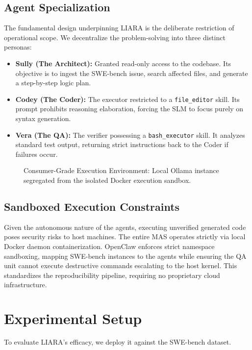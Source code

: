 \documentclass[10pt,journal,compsoc]{IEEEtran}
\begin{document}
\subsection{Agent Specialization}
The fundamental design underpinning LIARA is the deliberate restriction of operational scope. We decentralize the problem-solving into three distinct personas:
\begin{itemize}
    \item \textbf{Sully (The Architect):} Granted read-only access to the codebase. Its objective is to ingest the SWE-bench issue, search affected files, and generate a step-by-step logic plan.
    \item \textbf{Codey (The Coder):} The executor restricted to a \texttt{file\_editor} skill. Its prompt prohibits reasoning elaboration, forcing the SLM to focus purely on syntax generation.
    \item \textbf{Vera (The QA):} The verifier possessing a \texttt{bash\_executor} skill. It analyzes standard test output, returning strict instructions back to the Coder if failures occur.
\end{itemize}

\begin{figure}[!t]
\centering
\caption{Consumer-Grade Execution Environment: Local Ollama instance segregated from the isolated Docker execution sandbox.}
\label{fig_sandbox}
\end{figure}

\subsection{Sandboxed Execution Constraints}
Given the autonomous nature of the agents, executing unverified generated code poses security risks to host machines. The entire MAS operates strictly via local Docker daemon containerization. OpenClaw enforces strict namespace sandboxing, mapping SWE-bench instances to the agents while ensuring the QA unit cannot execute destructive commands escalating to the host kernel. This standardizes the reproducibility pipeline, requiring no proprietary cloud infrastructure.

\section{Experimental Setup}
\label{sec:setup}
To evaluate LIARA's efficacy, we deploy it against the SWE-bench dataset.
\end{document}
